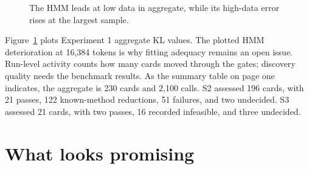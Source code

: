 \begin{figure}[ht]
\centering
{}
\caption{The HMM leads at low data in aggregate, while its high-data error rises at the largest sample.}
\label{fig:exp1}
\end{figure}

Figure~\ref{fig:exp1} plots Experiment 1 aggregate KL values. The plotted HMM deterioration at 16,384 tokens is why fitting adequacy remains an open issue. Run-level activity counts how many cards moved through the gates; discovery quality needs the benchmark results. As the summary table on page one indicates, the aggregate is 230 cards and 2,100 calls. S2 assessed 196 cards, with 21 passes, 122 known-method reductions, 51 failures, and two undecided. S3 assessed 21 cards, with two passes, 16 recorded infeasible, and three undecided.

\section{What looks promising}

